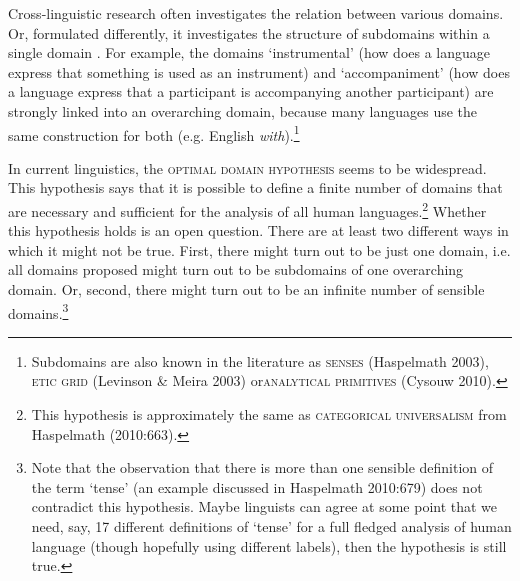 %
Cross-linguistic research often investigates the relation between various domains. Or, formulated differently, it investigates the structure of subdomains within a single domain .  For example, the domains `instrumental' (how does a language express that something is used as an instrument) and `accompaniment' (how does a language express that a participant is accompanying another participant) are strongly linked into an overarching domain, because many languages use the same construction for both (e.g. English \textit{with}).\footnote{Subdomains are also known in the literature as \textsc{senses} (Haspelmath 2003), \textsc{etic grid} (Levinson \& Meira 2003) or\textsc{analytical primitives} (Cysouw 2010).}

In current linguistics, the \textsc{optimal domain hypothesis} seems to be widespread. This hypothesis says that it is possible to define a finite number of domains that are necessary and sufficient for the analysis of all human languages.\footnote{This hypothesis is approximately the same as \textsc{categorical universalism} from Haspelmath (2010:663).} Whether this hypothesis holds is an open question. There are at least two different ways in which it might not be true. First, there might turn out to be just one domain, i.e. all domains proposed might turn out to be subdomains of one overarching domain. Or, second, there might turn out to be an infinite number of sensible domains.\footnote{Note that the observation that there is more than one sensible definition of the term `tense' (an example discussed in Haspelmath 2010:679) does not contradict this hypothesis. Maybe linguists can agree at some point that we need, say, 17 different definitions of `tense' for a full fledged analysis of human language (though hopefully using different labels), then the hypothesis is still true.}

